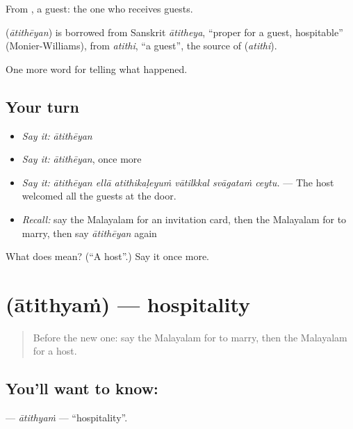From , a guest: the one who receives guests.

\begin{cousinweb}
\textbf{} (\emph{ātithēyan}) is borrowed from Sanskrit \emph{ātitheya}, \textquotedblleft{}proper for a guest, hospitable\textquotedblright{} (Monier-Williams), from \emph{atithi}, \textquotedblleft{}a guest\textquotedblright{}, the source of  (\emph{atithi}).
\end{cousinweb}

\begin{grammarlens}[title={What you've built}]
One more word for telling what happened.
\end{grammarlens}

\subsection*{Your turn}
\begin{itemize}
\raggedright
  \item \emph{Say it:} \emph{ātithēyan}
  \item \emph{Say it:} \emph{ātithēyan}, once more
  \item \emph{Say it:} \emph{ātithēyan ellā atithikaḷeyuṁ vātilkkal svāgataṁ ceytu.} — The host welcomed all the guests at the door.
  \item \emph{Recall:} say the Malayalam for an invitation card, then the Malayalam for to marry, then say \emph{ātithēyan} again
\end{itemize}

\begin{tcolorbox}[breakable,colback=teal!4,colframe=teal!35!black,title={Before you move on}]
What does  mean? (\textquotedblleft{}A host\textquotedblright{}.) Say it once more.
\end{tcolorbox}
\section[\texorpdfstring{\ml{ആതിഥ്യം} (ātithyaṁ)}{ആതിഥ്യം (ātithyaṁ)}]{ (ātithyaṁ) — hospitality}

\label{lesson:ML-C386-atithyam}



\begin{quote}
Before the new one: say the Malayalam for to marry, then the Malayalam for a host.
\end{quote}

\subsection*{You'll want to know: }
\textbf{} — \emph{ātithyaṁ} — \textquotedblleft{}hospitality\textquotedblright{}.


